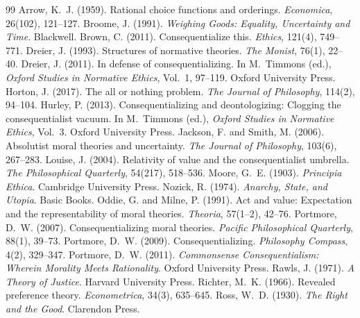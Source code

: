 \documentclass{situationist-preprint}
\begin{document}
\begin{thebibliography}{99}\small
{} Arrow, K.~J. (1959). Rational choice functions and orderings. \emph{Economica}, 26(102), 121--127.
 Broome, J. (1991). \emph{Weighing Goods: Equality, Uncertainty and Time}. Blackwell.
 Brown, C. (2011). Consequentialize this. \emph{Ethics}, 121(4), 749--771.
 Dreier, J. (1993). Structures of normative theories. \emph{The Monist}, 76(1), 22--40.
 Dreier, J. (2011). In defense of consequentializing. In M.~Timmons (ed.), \emph{Oxford Studies in Normative Ethics}, Vol.~1, 97--119. Oxford University Press.
 Horton, J. (2017). The all or nothing problem. \emph{The Journal of Philosophy}, 114(2), 94--104.
 Hurley, P. (2013). Consequentializing and deontologizing: Clogging the consequentialist vacuum. In M.~Timmons (ed.), \emph{Oxford Studies in Normative Ethics}, Vol.~3. Oxford University Press.
 Jackson, F. and Smith, M. (2006). Absolutist moral theories and uncertainty. \emph{The Journal of Philosophy}, 103(6), 267--283.
 Louise, J. (2004). Relativity of value and the consequentialist umbrella. \emph{The Philosophical Quarterly}, 54(217), 518--536.
 Moore, G.~E. (1903). \emph{Principia Ethica}. Cambridge University Press.
 Nozick, R. (1974). \emph{Anarchy, State, and Utopia}. Basic Books.
 Oddie, G. and Milne, P. (1991). Act and value: Expectation and the representability of moral theories. \emph{Theoria}, 57(1--2), 42--76.
 Portmore, D.~W. (2007). Consequentializing moral theories. \emph{Pacific Philosophical Quarterly}, 88(1), 39--73.
 Portmore, D.~W. (2009). Consequentializing. \emph{Philosophy Compass}, 4(2), 329--347.
 Portmore, D.~W. (2011). \emph{Commonsense Consequentialism: Wherein Morality Meets Rationality}. Oxford University Press.
 Rawls, J. (1971). \emph{A Theory of Justice}. Harvard University Press.
 Richter, M.~K. (1966). Revealed preference theory. \emph{Econometrica}, 34(3), 635--645.
 Ross, W.~D. (1930). \emph{The Right and the Good}. Clarendon Press.

\end{thebibliography}
\end{document}
